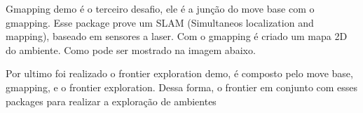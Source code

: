 
Gmapping demo é o terceiro desafio, ele é a junção do move base com o
gmapping. Esse package prove um SLAM (Simultaneos localization and mapping), 
baseado em sensores a laser. Com o gmapping é criado um mapa 2D do ambiente.
Como pode ser mostrado na imagem abaixo.


Por ultimo foi realizado o frontier exploration demo, é composto 
pelo move base, gmapping, e o frontier exploration. Dessa forma,
o frontier em conjunto com esses packages para realizar a 
exploração de ambientes








